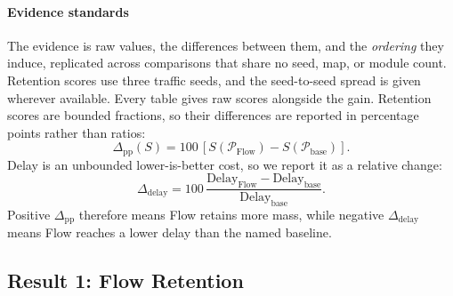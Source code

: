 \documentclass[journal]{IEEEtran}
\theoremstyle{definition}
\begin{document}
\paragraph{Evidence standards}
The evidence is raw values, the differences between them, and the \emph{ordering} they induce, replicated across comparisons that share no seed, map, or module count. Retention scores use three traffic seeds, and the seed-to-seed spread is given wherever available. Every table gives raw scores alongside the gain. Retention scores are bounded fractions, so their differences are reported in percentage points rather than ratios:
\begin{equation}
    \Delta_{\mathrm{pp}}(S)
    =
    100\,[S(\mathcal{P}_{\mathrm{Flow}})
        -S(\mathcal{P}_{\mathrm{base}})] .
    \label{eq:gainpp}
\end{equation}
Delay is an unbounded lower-is-better cost, so we report it as a relative change:
\begin{equation}
    \Delta_{\mathrm{delay}}
    =
    100\,\frac{\mathrm{Delay}_{\mathrm{Flow}}
        -\mathrm{Delay}_{\mathrm{base}}}
    {\mathrm{Delay}_{\mathrm{base}}}.
    \label{eq:waitgain}
\end{equation}
Positive $\Delta_{\mathrm{pp}}$ therefore means Flow retains more mass, while negative $\Delta_{\mathrm{delay}}$ means Flow reaches a lower delay than the named baseline.

\subsection{Result 1: Flow Retention}
\label{sec:exp-phi}
\end{document}
